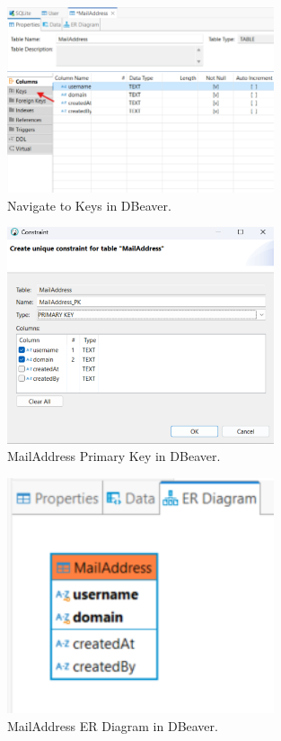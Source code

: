 \documentclass[a4paper,11pt,oneside]{article}
\begin{document}
\begin{sloppypar}
\begin{figure}[!htb]
  \centering
  \includegraphics[width=0.7\textwidth]{dbeaver/table_keys_navigate.png}
  \caption{Navigate to Keys in DBeaver.}
  \label{fig:table_keys_navigate}
\end{figure}

\begin{figure}[!htb]
  \centering
  \includegraphics[width=0.7\textwidth]{dbeaver/mail_address_primary_key.png}
  \caption{MailAddress Primary Key in DBeaver.}
  \label{fig:mail_address_primary_key}
\end{figure}

\begin{figure}[!htb]
  \centering
  \includegraphics[width=0.7\textwidth]{dbeaver/mail_address_er_diagram.png}
  \caption{MailAddress ER Diagram in DBeaver.}
  \label{fig:mail_address_er_diagram}
\end{figure}


\end{sloppypar}
\end{document}
